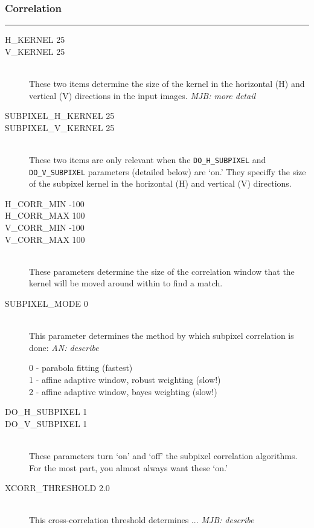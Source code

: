 \subsubsection*{Correlation}
\hrule
\bigskip

\begin{description}
\item[H\_KERNEL 25]
\item[V\_KERNEL 25] \hfill \\
These two items determine the size of the kernel in the horizontal (H) and vertical (V) directions in the input images.  \emph{MJB: more detail}

\item[SUBPIXEL\_H\_KERNEL 25]
\item[SUBPIXEL\_V\_KERNEL 25] \hfill \\
These two items are only relevant when the \texttt{DO\_H\_SUBPIXEL} and \texttt{DO\_V\_SUBPIXEL} parameters (detailed below) are `on.'  They speciffy the size of the subpixel kernel in the horizontal (H) and vertical (V) directions.

\item[H\_CORR\_MIN -100]
\item[H\_CORR\_MAX 100]
\item[V\_CORR\_MIN -100]
\item[V\_CORR\_MAX 100] \hfill \\
These parameters determine the size of the correlation window that the kernel will be moved around within to find a match.

\item[SUBPIXEL\_MODE 0] \hfill \\
This parameter determines the method by which subpixel correlation is done:
\emph{AN: describe}
	\begin{description}
	\item[0 - parabola fitting (fastest)]
	\item[1 - affine adaptive window, robust weighting (slow!)]
	\item[2 - affine adaptive window, bayes weighting (slow!)]
	\end{description}

\item[DO\_H\_SUBPIXEL 1]
\item[DO\_V\_SUBPIXEL 1] \hfill \\
These parameters turn `on' and `off' the subpixel correlation
algorithms.  For the most part, you almost always want these `on.'

\item[XCORR\_THRESHOLD 2.0] \hfill \\
This cross-correlation threshold determines ... \emph{MJB: describe}


\end{description}
